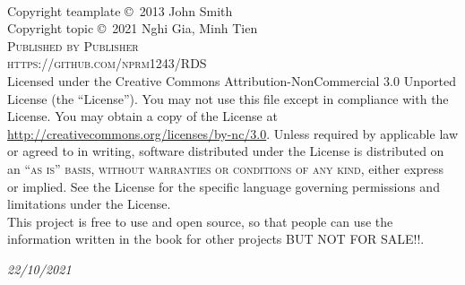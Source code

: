 \documentclass[11pt,fleqn]{book} %
\begin{document}




\newpage
~\vfill
\thispagestyle{empty}

\noindent Copyright teamplate \copyright\ 2013 John Smith\\ %
\noindent Copyright topic \copyright\ 2021 Nghi Gia, Minh Tien \\ %
\noindent \textsc{Published by Publisher}\\ %

\noindent \textsc{https://github.com/nprm1243/RDS}\\ %

\noindent Licensed under the Creative Commons Attribution-NonCommercial 3.0 Unported License (the ``License''). You may not use this file except in compliance with the License. You may obtain a copy of the License at \url{http://creativecommons.org/licenses/by-nc/3.0}. Unless required by applicable law or agreed to in writing, software distributed under the License is distributed on an \textsc{``as is'' basis, without warranties or conditions of any kind}, either express or implied. See the License for the specific language governing permissions and limitations under the License.\\ %

\noindent This project is free to use and open source, so that people can use the information written in the book for other projects BUT NOT FOR SALE!!.

\noindent \textit{22/10/2021} %



\end{document}
